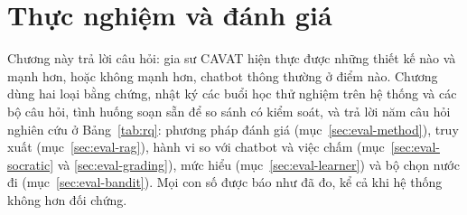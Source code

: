 \chapter{Thực nghiệm và đánh giá}\label{chap:eval}

Chương này trả lời câu hỏi: gia sư CAVAT hiện thực được những thiết kế nào và mạnh hơn, hoặc không mạnh hơn, chatbot thông thường ở điểm nào. Chương dùng hai loại bằng chứng, nhật ký các buổi học thử nghiệm trên hệ thống và các bộ câu hỏi, tình huống soạn sẵn để so sánh có kiểm soát, và trả lời năm câu hỏi nghiên cứu ở Bảng~\ref{tab:rq}: phương pháp đánh giá (mục~\ref{sec:eval-method}), truy xuất (mục~\ref{sec:eval-rag}), hành vi so với chatbot và việc chấm (mục~\ref{sec:eval-socratic} và \ref{sec:eval-grading}), mức hiểu (mục~\ref{sec:eval-learner}) và bộ chọn nước đi (mục~\ref{sec:eval-bandit}). Mọi con số được báo như đã đo, kể cả khi hệ thống không hơn đối chứng.








